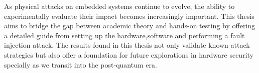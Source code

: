 As physical attacks on embedded systems continue to evolve, the ability to experimentally evaluate their impact becomes increasingly important. This thesis aims to bridge the gap between academic theory and hands-on testing by offering a detailed guide from setting up the hardware,software and performing a fault injection attack. The results found in this thesis not only validate known attack strategies but also offer a foundation for future explorations in hardware security specially as we transit into the post-quantum era.











